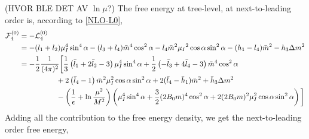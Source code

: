 (HVOR BLE DET AV $\ln \mu$?)
The free energy at tree-level, at next-to-leading order is, according to \cref{NLO-L0}, 
\begin{align*}
    \mathcal{F}^{(0)}_4
    & 
    = - \mathcal{L}_4^{(0)} 
    \\
    & = 
    - (l_1 + l_2)\mu_I^4 \sin^4{\alpha}
    - (l_3 + l_4)\bar m^4 \cos^2{\alpha}
    - l_4 \bar m^2 \mu_I{}^2 \cos{\alpha} \sin^2{\alpha}
    -(h_1- l_4) \bar m^2
    - h_3 \Delta m^2
    \\
    & = 
    - \frac{1}{2} \frac{1}{(4 \pi)^2}
    \bigg[
        \frac{1}{3}
        \left( 
            \bar l_1 + 2 \bar l_2 - 3
        \right) \mu_I^4 \sin^4 \alpha
        +
        \frac{1}{2}
        \left(
            - \bar l_3 + 4 \bar l_4 - 3
        \right) \bar m^4 \cos^2\alpha
        \\
        & \quad \quad \quad \quad \quad
        + 2 \left(\bar l_4 - 1\right)
        \bar m^2 \mu_I^2 \cos\alpha \sin^2 \alpha
        + 2 (\bar l_4 - \bar h_1) \bar m^2
        + \bar h_3 \Delta m^2
        \\
        & \quad \quad \quad \quad \quad
        - 
        \left(\frac{1}{\epsilon} + \ln \frac{\mu^2}{M^2}\right) 
        \left(
            \mu_I^4\sin^4\alpha + \frac{3}{2} (2 B_0 m)^4 \cos^2 \alpha
            + 2 (2 B_0 m)^2 \mu_I^2 \cos\alpha \sin^2 \alpha
        \right) 
    \bigg] 
\end{align*}
Adding all the contribution to the free energy density, we get the next-to-leading order free energy,
